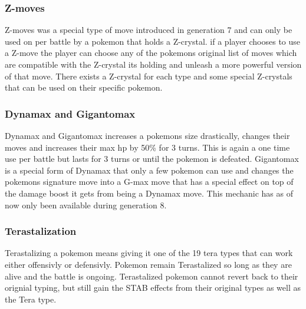 \subsubsection{Z-moves}
Z-moves was a special type of move introduced in generation 7 and can only be used on per battle by a pokemon that holds a Z-crystal. if a player chooses to 
use a Z-move the player can choose any of the pokemons original list of moves which are compatible with the Z-crystal its holding and unleash a more powerful
version of that move. There exists a Z-crystal for each type and some special Z-crystals that can be used on their specific pokemon. \cite{Zmoves}
\subsubsection{Dynamax and Gigantomax}
Dynamax and Gigantomax increases a pokemons size drastically, changes their moves and increases their max hp by 50\% for 3 turns. This is again a one time
use per battle but lasts for 3 turns or until the pokemon is defeated. Gigantomax is a special form of Dynamax that only a few pokemon can use and 
changes the pokemons signature move into a G-max move that has a special effect on top of the damage boost it gets from being a Dynamax move.
This mechanic has as of now only been available during generation 8. \cite{Dynamax}
\subsubsection{Terastalization}
Terastalizing a pokemon means giving it one of the 19 tera types that can work either offensivly or defensivly. Pokemon remain Terastalized so long 
as they are alive and the battle is ongoing. Terastalized pokemon cannot revert back to their orignial typing, but still gain the STAB effects 
from their original types as well as the Tera type. \cite{TeraType}